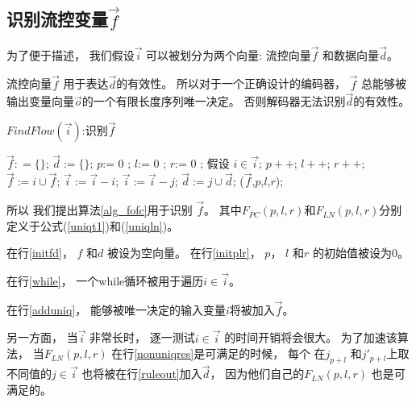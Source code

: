 \subsection{识别流控变量$\vec{f}$}\label{basic}

为了便于描述，
我们假设$\vec{i}$ 可以被划分为两个向量:
流控向量$\vec{f}$ 和数据向量$\vec{d}$。

流控向量$\vec{f}$ 用于表达$\vec{d}$的有效性。
所以对于一个正确设计的编码器，
$\vec{f}$ 总能够被输出变量向量$\vec{o}$的一个有限长度序列唯一决定。
否则解码器无法识别$\vec{d}$的有效性。


\begin{algorithm}[b]
\caption{$FindFlow(\vec{i})$:识别$\vec{f}$}
\label{alg_fofc}
\begin{algorithmic}[1]
\STATE $\vec{f}: = \{\}$;
\STATE $\vec{d}:= \{\}$\label{initfd};
\STATE $p$:= 0 ;
\STATE $l$:= 0 ;
\STATE $r$:= 0 \label{initplr};
\label{while}
  \STATE 假设 $i\in\vec{i}$;
  \STATE $p++$;
  \STATE $l++$;
  \STATE $r++$;
    \label{adduniq}
    \STATE $\vec{f}:= i\cup\vec{f}$;
    \STATE $\vec{i}:=\vec{i}-i$;
  \label{nonuniqres}
\label{ruleout}      
	\STATE $\vec{i}:=\vec{i}-j$;
	\STATE $\vec{d}:=j\cup\vec{d}$;
      \ENDIF
    \ENDFOR
  \ENDIF
\ENDWHILE
\RETURN ($\vec{f}$,$p$,$l$,$r$);
\end{algorithmic}
\end{algorithm}

所以
我们提出算法\ref{alg_fofc}用于识别 $\vec{f}$。
其中$F_{PC}(p,l,r)$和$F_{LN}(p,l,r)$分别定义于公式(\ref{uniqt1})和(\ref{uniqln})。


在行\ref{initfd}，
$f$ 和$d$ 被设为空向量。
在行\ref{initplr}，
$p$， $l$ 和$r$ 的初始值被设为0。

在行\ref{while}，
一个while循环被用于遍历$i\in\vec{i}$。

在行\ref{adduniq}，
能够被唯一决定的输入变量$i$将被加入$\vec{f}$。

另一方面，
当$\vec{i}$ 非常长时，
逐一测试$i\in\vec{i}$ 的时间开销将会很大。
为了加速该算法，
当$F_{LN}(p,l,r)$ 在行\ref{nonuniqres}是可满足的时候，
每个 在$j_{p+l}$ 和$j'_{p+l}$上取不同值的$j\in\vec{i}$
也将被在行\ref{ruleout}加入$\vec{d}$，
因为他们自己的$F_{LN}(p,l,r)$ 也是可满足的。


